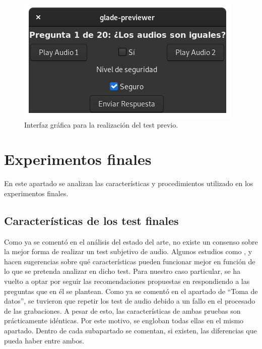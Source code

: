 \documentclass[11pt,a4paper,twoside]{book}
\begin{document}
                 \begin{figure}[H]
                    \includegraphics[scale=0.6]{../imagenes/uiIni.png}
			        \centering
			        \caption{Interfaz gráfica para la realización del test previo.}
			        \label{fig:interfazInicial}
                \end{figure}
                
        \section{Experimentos finales}
            En este apartado se analizan las características y procedimientos utilizado en los experimentos finales.     
            
            \subsection{Características de los test finales}
                Como ya se comentó en el análisis del estado del arte, no existe un consenso sobre la mejor forma de realizar un test subjetivo de audio. Algunos estudios como \cite{Tejada2020}, \cite{delaPrida2019} y \cite{delaPrida2021} hacen sugerencias sobre qué características pueden funcionar mejor en función de lo que se pretenda analizar en dicho test. Para nuestro caso particular, se ha vuelto a optar por seguir las recomendaciones propuestas en \cite{Tejada2020} respondiendo a las preguntas que en él se plantean. Como ya se comentó en el apartado de ``Toma de datos'', se tuvieron que repetir los test de audio debido a un fallo en el procesado de las grabaciones. A pesar de esto, las características de ambas pruebas son prácticamente idénticas. Por este motivo, se engloban todas ellas en el mismo apartado. Dentro de cada subapartado se comentan, si existen, las diferencias que pueda haber entre ambos.
            
\end{document}
